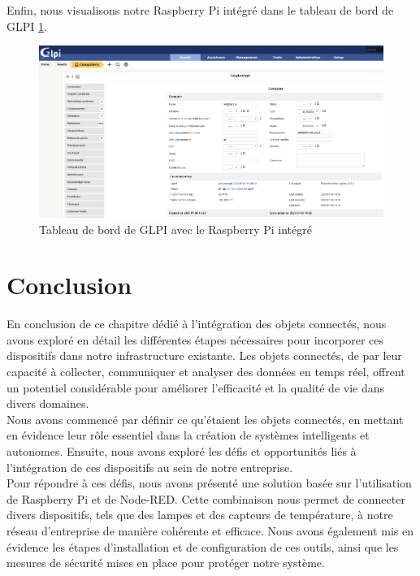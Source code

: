 Enfin, nous visualisons notre Raspberry Pi intégré dans le tableau de bord de GLPI \ref{fig:glpi-raspberry}.

\begin{figure}[H]
\centering
\includegraphics[width=16.5cm]{Images/RASPBERRYPIGLPI.png}
\caption{Tableau de bord de GLPI avec le Raspberry Pi intégré}
\label{fig:glpi-raspberry}
\end{figure}

\bigskip

\section{Conclusion}

En conclusion de ce chapitre dédié à l'intégration des objets connectés, nous avons exploré en détail les différentes étapes nécessaires pour incorporer ces dispositifs dans notre infrastructure existante. Les objets connectés, de par leur capacité à collecter, communiquer et analyser des données en temps réel, offrent un potentiel considérable pour améliorer l'efficacité et la qualité de vie dans divers domaines. \\

Nous avons commencé par définir ce qu'étaient les objets connectés, en mettant en évidence leur rôle essentiel dans la création de systèmes intelligents et autonomes. Ensuite, nous avons exploré les défis et opportunités liés à l'intégration de ces dispositifs au sein de notre entreprise. \\

Pour répondre à ces défis, nous avons présenté une solution basée sur l'utilisation de Raspberry Pi et de Node-RED. Cette combinaison nous permet de connecter divers dispositifs, tels que des lampes et des capteurs de température, à notre réseau d'entreprise de manière cohérente et efficace. Nous avons également mis en évidence les étapes d'installation et de configuration de ces outils, ainsi que les mesures de sécurité mises en place pour protéger notre système. \\

